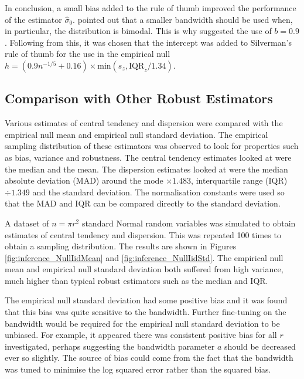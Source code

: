 In conclusion, a small bias added to the rule of thumb improved the performance of the estimator $\widehat{\sigma}_0$. \cite{silverman1986density} pointed out that a smaller bandwidth should be used when, in particular, the distribution is bimodal. This is why \cite{silverman1986density} suggested the use of $b=0.9$. Following from this, it was chosen that the intercept was added to Silverman's rule of thumb for the use in the empirical null $h = \left(0.9n^{-1/5}+ 0.16\right) \times\text{min}\left(s_z,\text{IQR}_z/1.34\right)$.

\afterpage{\clearpage}
\subsection{Comparison with Other Robust Estimators}

Various estimates of central tendency and dispersion were compared with the empirical null mean and empirical null standard deviation. The empirical sampling distribution of these estimators was observed to look for properties such as bias, variance and robustness. The central tendency estimates looked at were the median and the mean. The dispersion estimates looked at were the median absolute deviation (MAD) around the mode $\times 1.483$, interquartile range (IQR) $\div 1.349$ and the standard deviation. The normalisation constants were used so that the MAD and IQR can be compared directly to the standard deviation.

A dataset of $n = \pi r^2$ standard Normal random variables was simulated to obtain estimates of central tendency and dispersion. This was repeated 100 times to obtain a sampling distribution. The results are shown in Figures \ref{fig:inference_NullIidMean} and \ref{fig:inference_NullIidStd}. The empirical null mean and empirical null standard deviation both suffered from high variance, much higher than typical robust estimators such as the median and IQR.

The empirical null standard deviation had some positive bias and it was found that this bias was quite sensitive to the bandwidth. Further fine-tuning on the bandwidth would be required for the empirical null standard deviation to be unbiased. For example, it appeared there was consistent positive bias for all $r$ investigated, perhaps suggesting the bandwidth parameter $a$ should be decreased ever so slightly. The source of bias could come from the fact that the bandwidth was tuned to minimise the log squared error rather than the squared bias.

